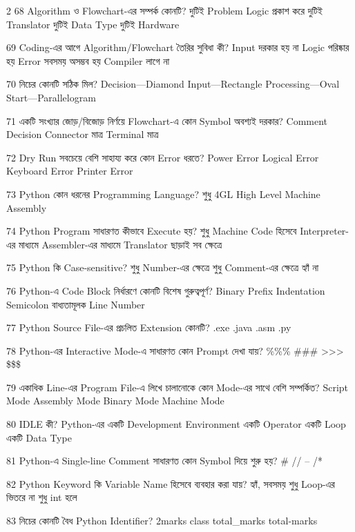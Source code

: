 \begin{multicols}{2}
\mcqwide
{68}
{Algorithm ও Flowchart-এর সম্পর্ক কোনটি?}
{দুটিই Problem Logic প্রকাশ করে}
{দুটিই Translator}
{দুটিই Data Type}
{দুটিই Hardware}

\mcq
{69}
{Coding-এর আগে Algorithm/Flowchart তৈরির সুবিধা কী?}
{Input দরকার হয় না}
{Logic পরিষ্কার হয়}
{Error সবসময় অসম্ভব হয়}
{Compiler লাগে না}

\mcq
{70}
{নিচের কোনটি সঠিক মিল?}
{Decision—Diamond}
{Input—Rectangle}
{Processing—Oval}
{Start—Parallelogram}

\mcq
{71}
{একটি সংখ্যার জোড়/বিজোড় নির্ণয়ে Flowchart-এ কোন Symbol অবশ্যই দরকার?}
{Comment}
{Decision}
{Connector মাত্র}
{Terminal মাত্র}

\mcq
{72}
{Dry Run সবচেয়ে বেশি সাহায্য করে কোন Error ধরতে?}
{Power Error}
{Logical Error}
{Keyboard Error}
{Printer Error}

\mcq
{73}
{Python কোন ধরনের Programming Language?}
{শুধু 4GL}
{High Level}
{Machine}
{Assembly}

\mcqwide
{74}
{Python Program সাধারণত কীভাবে Execute হয়?}
{শুধু Machine Code হিসেবে}
{Interpreter-এর মাধ্যমে}
{Assembler-এর মাধ্যমে}
{Translator ছাড়াই সব ক্ষেত্রে}

\mcq
{75}
{Python কি Case-sensitive?}
{শুধু Number-এর ক্ষেত্রে}
{শুধু Comment-এর ক্ষেত্রে}
{হ্যাঁ}
{না}

\mcq
{76}
{Python-এ Code Block নির্ধারণে কোনটি বিশেষ গুরুত্বপূর্ণ?}
{Binary Prefix}
{Indentation}
{Semicolon বাধ্যতামূলক}
{Line Number}

\mcq
{77}
{Python Source File-এর প্রচলিত Extension কোনটি?}
{.exe}
{.java}
{.asm}
{.py}

\mcq
{78}
{Python-এর Interactive Mode-এ সাধারণত কোন Prompt দেখা যায়?}
{\%\%\%}
{\#\#\#}
{>>>}
{\$\$\$}

\mcq
{79}
{একাধিক Line-এর Program File-এ লিখে চালানোকে কোন Mode-এর সাথে বেশি সম্পর্কিত?}
{Script Mode}
{Assembly Mode}
{Binary Mode}
{Machine Mode}

\mcqwide
{80}
{IDLE কী?}
{Python-এর একটি Development Environment}
{একটি Operator}
{একটি Loop}
{একটি Data Type}

\mcq
{81}
{Python-এ Single-line Comment সাধারণত কোন Symbol দিয়ে শুরু হয়?}
{\#}
{//}
{--}
{/*}

\mcq
{82}
{Python Keyword কি Variable Name হিসেবে ব্যবহার করা যায়?}
{হ্যাঁ, সবসময়}
{শুধু Loop-এর ভিতরে}
{না}
{শুধু int হলে}

\mcq
{83}
{নিচের কোনটি বৈধ Python Identifier?}
{2marks}
{class}
{total\_marks}
{total-marks}


\end{multicols}
